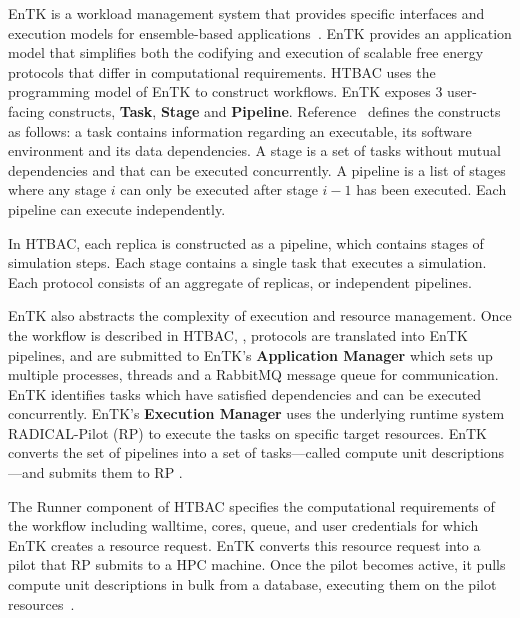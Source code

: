 EnTK is a workload management system that provides specific interfaces and 
execution models for ensemble-based applications~\cite{power-of-many17}. EnTK 
provides an application model that simplifies both the codifying and execution 
of scalable free energy protocols that differ in computational requirements. 
HTBAC uses the programming model of EnTK to construct workflows. EnTK exposes 3 
user-facing constructs, \textbf{Task}, \textbf{Stage} and \textbf{Pipeline}. 
Reference~\cite{power-of-many17} defines the constructs as follows: a task 
contains information regarding an executable, its software environment and its 
data dependencies. A stage is a set of tasks without mutual dependencies and 
that can be executed concurrently. A pipeline is a list of stages where any 
stage $i$ can only be executed after stage $i - 1$ has been executed. Each 
pipeline can execute independently. 

In HTBAC, each replica is constructed as a pipeline, which contains stages of 
simulation steps. Each stage contains a single task that executes a
simulation. Each protocol consists of an aggregate of replicas, or independent 
pipelines. 

EnTK also abstracts the complexity of execution and resource management. 
Once the workflow is described in HTBAC, , protocols are translated into EnTK pipelines, and are 
submitted to EnTK's 
\textbf{Application Manager} which sets up multiple processes, threads and a 
RabbitMQ message queue for communication. EnTK identifies tasks which have 
satisfied dependencies and can be executed concurrently. EnTK's 
\textbf{Execution Manager} uses the underlying runtime system RADICAL-Pilot (RP) 
to execute the tasks on specific target resources. EnTK converts the set of 
pipelines into a set of tasks---called compute unit descriptions---and submits 
them to RP .

The Runner component of HTBAC specifies the computational requirements of the 
workflow including walltime, cores, queue, and user credentials 
 for which EnTK creates a resource request. 
EnTK converts this resource request into a pilot that RP submits to a HPC 
machine. Once the pilot becomes active, it pulls compute unit descriptions in 
bulk from a database, executing them on the pilot 
resources~\cite{merzky2015radical}. 

